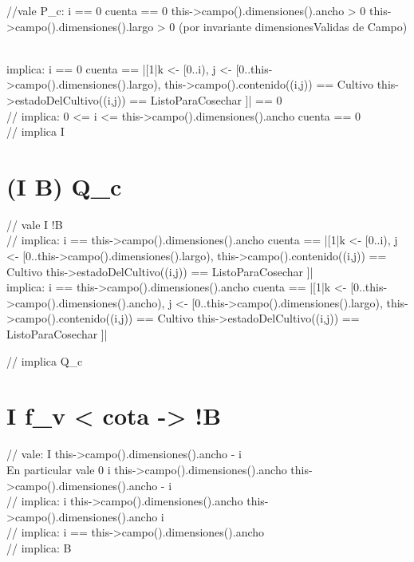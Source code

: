 \documentclass{article}
\begin{document}
//vale  P_c: i == 0 \land cuenta == 0 \land this->campo().dimensiones().ancho > 0 \land this->campo().dimensiones().largo > 0 (por invariante dimensionesValidas de Campo)

\\ implica: i == 0 \land cuenta == |[1|k <- [0..i), j <- [0..this->campo().dimensiones().largo), this->campo().contenido((i,j)) == Cultivo \land this->estadoDelCultivo((i,j)) == ListoParaCosechar ]| == 0 \\
// implica: 0 <= i <= this->campo().dimensiones().ancho \land cuenta == 0 \\
// implica I \\
 
 
 
\maketitle

\section{(I \land \lnot B) \Rightarrow Q_c} 
 
// vale I \land !B \\
// implica: i == this->campo().dimensiones().ancho \land cuenta == |[1|k <- [0..i), j <- [0..this->campo().dimensiones().largo), this->campo().contenido((i,j)) == Cultivo \land this->estadoDelCultivo((i,j)) == ListoParaCosechar ]| \\
implica: i == this->campo().dimensiones().ancho \land cuenta == |[1|k <- [0..this->campo().dimensiones().ancho), j <- [0..this->campo().dimensiones().largo), this->campo().contenido((i,j)) == Cultivo \land this->estadoDelCultivo((i,j)) == ListoParaCosechar ]|

// implica Q_c \\


\maketitle

\section{ I \land f_v < cota -> !B}

// vale: I \land this->campo().dimensiones().ancho - i  \\

En particular vale 0 \leq i \leq this->campo().dimensiones().ancho \land this->campo().dimensiones().ancho - i  \\
// implica: i \leq this->campo().dimensiones().ancho \land this->campo().dimensiones().ancho \leq i \\
// implica: i == this->campo().dimensiones().ancho \\
// implica: \lnot B \\
 
 
 
\end{document}
